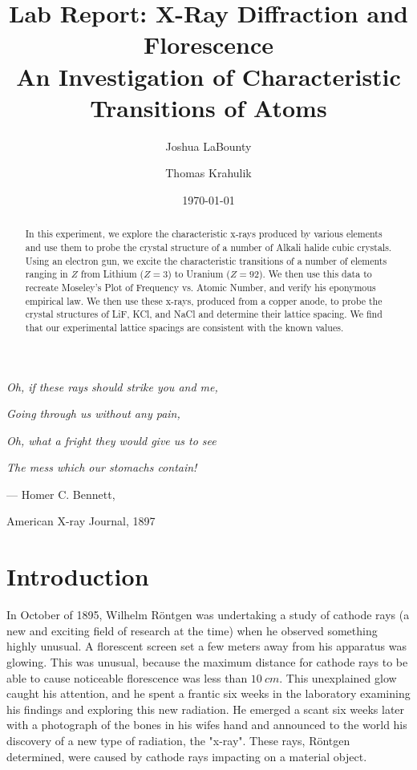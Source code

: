 \documentclass[%
 reprint,
 amsmath,amssymb,
 aps,
 pra,
]{revtex4-1}
\begin{document}

\title{\textbf{Lab Report: X-Ray Diffraction and Florescence} \\ \small{An Investigation of Characteristic Transitions of Atoms}}
\author{Joshua LaBounty}
\author{Thomas Krahulik}

\date{\today}

\begin{abstract}
In this experiment, we explore the characteristic x-rays produced by various elements and use them to probe the crystal structure of a number of Alkali halide cubic crystals. Using an electron gun, we excite the characteristic transitions of a number of elements ranging in $Z$ from Lithium ($Z = 3$) to Uranium ($Z = 92$). We then use this data to recreate Moseley's Plot of Frequency vs. Atomic Number, and verify his eponymous empirical law. We then use these x-rays, produced from a copper anode, to probe the crystal structures of LiF, KCl, and NaCl and determine their lattice spacing. We find that our experimental lattice spacings are consistent with the known values.
\end{abstract}
\maketitle

\begin{center}
\textit{Oh, if these rays should strike you and me,}

\textit{Going through us without any pain,}

\textit{Oh, what a fright they would give us to see}

\textit{The mess which our stomachs contain!}
\end{center}

\begin{flushright}
--- Homer C. Bennett,

American X-ray Journal, 1897
\end{flushright}

\section{Introduction}

In October of 1895, Wilhelm R\"{o}ntgen was undertaking a study of cathode rays (a new and exciting field of research at the time) when he observed something highly unusual. A florescent screen set a few meters away from his apparatus was glowing\cite{xray_history}. This was unusual, because the maximum distance for cathode rays to be able to cause noticeable florescence was less than $10~cm$. This unexplained glow caught his attention, and he spent a frantic six weeks in the laboratory examining his findings and exploring this new radiation. He emerged a scant six weeks later with a photograph of the bones in his wifes hand and announced to the world his discovery of a new type of radiation, the "x-ray"\cite{rontgen_paper, 50years}. These rays, R\"{o}ntgen determined, were caused by cathode rays impacting on a material object. 
\end{document}
